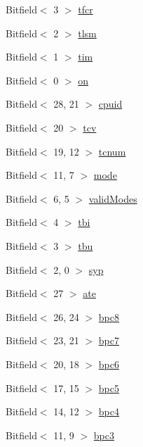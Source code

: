 \begin{DoxyCompactItemize}
\item 
Bitfield$<$ 3 $>$ \hyperlink{namespaceMipsISA_a16cba5095022a697d04b89d3bdc860e2}{tfcr}
\item 
Bitfield$<$ 2 $>$ \hyperlink{namespaceMipsISA_a076c808954e2734286633bbd6ba90390}{tlsm}
\item 
Bitfield$<$ 1 $>$ \hyperlink{namespaceMipsISA_a67731f4398a23c786b0297b441502e1d}{tim}
\item 
Bitfield$<$ 0 $>$ \hyperlink{namespaceMipsISA_a224bbd01abfc298b335097c93c0c7b99}{on}
\item 
Bitfield$<$ 28, 21 $>$ \hyperlink{namespaceMipsISA_ad8c57e94aa3e790a8d7259e5b798123b}{cpuid}
\item 
Bitfield$<$ 20 $>$ \hyperlink{namespaceMipsISA_ad330cc9efdc7c52976bf04e5cf1ffcc7}{tcv}
\item 
Bitfield$<$ 19, 12 $>$ \hyperlink{namespaceMipsISA_a8d94837795e38cfe435762ab4cccd05d}{tcnum}
\item 
Bitfield$<$ 11, 7 $>$ \hyperlink{namespaceMipsISA_ae317cde5969f1a58116b73ae0d8adec0}{mode}
\item 
Bitfield$<$ 6, 5 $>$ \hyperlink{namespaceMipsISA_ad5c29b27e529af3e788395fdaf063787}{validModes}
\item 
Bitfield$<$ 4 $>$ \hyperlink{namespaceMipsISA_a26e278edde701c4a4573f1c17a87bd6e}{tbi}
\item 
Bitfield$<$ 3 $>$ \hyperlink{namespaceMipsISA_aad4c85ae8f386c74dfa7dd7fcf09c921}{tbu}
\item 
Bitfield$<$ 2, 0 $>$ \hyperlink{namespaceMipsISA_ab020cd9a82d07f268f3b10523d607efd}{syp}
\item 
Bitfield$<$ 27 $>$ \hyperlink{namespaceMipsISA_a02e1efd8c21a9ceba960d9428265280d}{ate}
\item 
Bitfield$<$ 26, 24 $>$ \hyperlink{namespaceMipsISA_a90ea352a32fec899e528c966701b6c5a}{bpc8}
\item 
Bitfield$<$ 23, 21 $>$ \hyperlink{namespaceMipsISA_a8a7572e06c7fcb1aac7d4fe46e384e59}{bpc7}
\item 
Bitfield$<$ 20, 18 $>$ \hyperlink{namespaceMipsISA_a0cd07b493bfb52d3b9764ec34390303f}{bpc6}
\item 
Bitfield$<$ 17, 15 $>$ \hyperlink{namespaceMipsISA_ab4ac96a2450ae9760798b1be71fa3c96}{bpc5}
\item 
Bitfield$<$ 14, 12 $>$ \hyperlink{namespaceMipsISA_a95e55a098a49837af1e912a1f1ef1c70}{bpc4}
\item 
Bitfield$<$ 11, 9 $>$ \hyperlink{namespaceMipsISA_ab22a4b275a3efd7500855165e7814fb0}{bpc3}
\item 

\end{DoxyCompactItemize}

